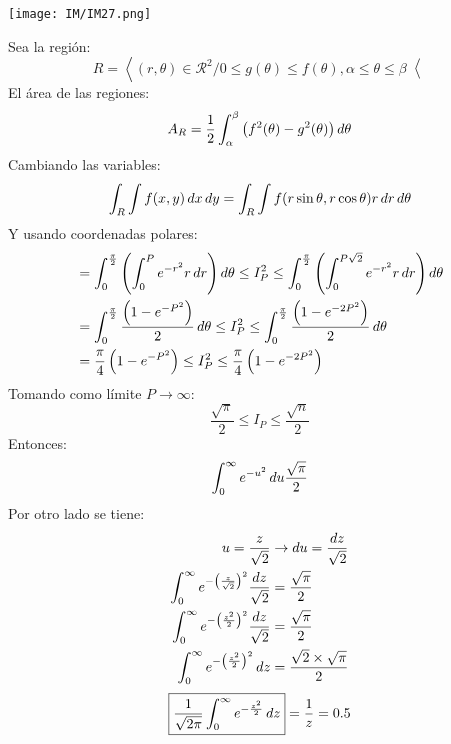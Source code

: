 \documentclass[
	12pt, %
	fleqn, %
	a4paper, %
]{LegrandOrangeBook}
\begin{document}
\begin{theorem}[Demostrar $\int_0^{\infty}e^{-u^2}\diff u=\frac{\sqrt{\pi}}{2}$]
\begin{center}
\texttt{[image: IM/IM27.png]}
\end{center}
Sea la región:
\begin{displaymath}
R=\left\langle(r,\theta)\in\mathcal{R}^2/0\leq g(\theta)\leq f(\theta),\alpha\leq\theta\leq\beta \right\langle
\end{displaymath}
El área de las regiones:
\begin{displaymath}
A_R=\frac{1}{2}\int_{\alpha}^{\beta}\left(f^2(\theta)-g^2(\theta)\right)\mathop{}\!d\theta
\end{displaymath}
Cambiando las variables:
\begin{displaymath}
\int_R\int f(x,y)\mathop{}\!d x\mathop{}\!d y=\int_R\int f(r\sin\theta,r\cos\theta)r\mathop{}\!d r\mathop{}\!d\theta
\end{displaymath}
Y usando coordenadas polares:
\begin{align*}
&=\int_0^{\frac{\pi}{2}}\left(\int_0^Pe^{-r^2}r\mathop{}\!d r\right)\mathop{}\!d\theta\leq I_P^2\leq \int_0^{\frac{\pi}{2}}\left(\int_0^{P\sqrt{2}}e^{-r^2}r\mathop{}\!d r\right)\mathop{}\!d\theta\\
&=\int_0^{\frac{\pi}{2}}\frac{\left(1-e^{-P^2}\right)}{2}\mathop{}\!d\theta\leq I_P^2\leq \int_0^{\frac{\pi}{2}}\frac{\left(1-e^{-2P^2}\right)}{2}\mathop{}\!d\theta\\
&=\frac{\pi}{4}\left(1-e^{-P^2}\right)\leq I_P^2\leq\frac{\pi}{4}\left(1-e^{-2P^2}\right)
\end{align*}
Tomando como límite $P\to\infty$:
\begin{displaymath}
\frac{\sqrt{\pi}}{2}\leq I_P\leq\frac{\sqrt{n}}{2}
\end{displaymath}
Entonces:
\begin{displaymath}
\int_0^{\infty}e^{-u^2}\mathop{}\!d u\frac{\sqrt{\pi}}{2}
\end{displaymath}
Por otro lado se tiene:
\begin{align*}
u=\frac{z}{\sqrt{2}}&\rightarrow\mathop{}\!d u=\frac{\mathop{}\!d z}{\sqrt{2}}\\
\int_0^{\infty}e^{-\left(\frac{z}{\sqrt{2}}\right)^2}\frac{\mathop{}\!d z}{\sqrt{2}}&=\frac{\sqrt{\pi}}{2}\\
\int_0^{\infty}e^{-\left(\frac{z^2}{2}\right)^2}\frac{\mathop{}\!d z}{\sqrt{2}}&=\frac{\sqrt{\pi}}{2}\\
\int_0^{\infty}e^{-\left(\frac{z^2}{2}\right)^2}\mathop{}\!d z&=\frac{\sqrt{2}\times\sqrt{\pi}}{2}
\end{align*}
\begin{equation*}
\boxed{\frac{1}{\sqrt{2\pi}}\int_0^{\infty}e^{-\frac{z^2}{2}}\mathop{}\!d z}=\frac{1}{z}=0.5
\end{equation*}

\end{theorem}
\end{document}
